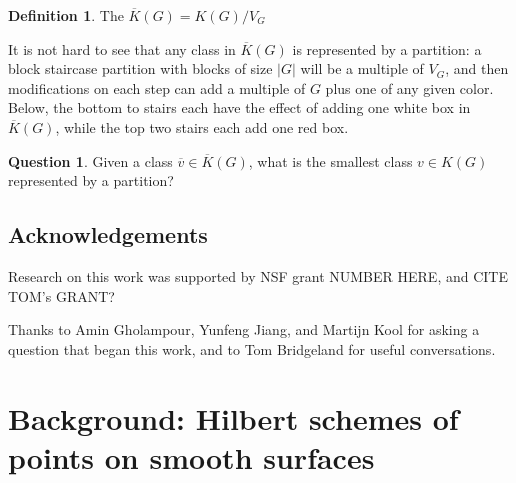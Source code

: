 \documentclass{amsart}[12pt]
\theoremstyle{definition}
\newtheorem{definition}[dummy]{Definition}
\newtheorem{question}{Question}
\begin{document}
\begin{definition}
The $\overline{K}(G)=K(G)/V_G$ 
\end{definition}

It is not hard to see that any class in $\overline{K}(G)$ is represented by a partition: a block staircase partition with blocks of size $|G|$ will be a multiple of $V_G$, and then modifications on each step can add a multiple of $G$ plus one of any given color.  Below, the bottom to stairs each have the effect of adding one white box in $\overline{K}(G)$, while the top two stairs each add one red box.



\begin{question}
Given a class $\overline{v}\in \overline{K}(G)$, what is the smallest class $v\in K(G)$ represented by a partition?
\end{question}


\subsection{Acknowledgements}

Research on this work was supported by NSF grant NUMBER HERE, and CITE TOM's GRANT?

Thanks to Amin Gholampour, Yunfeng Jiang, and Martijn Kool for asking a question that began this work, and to Tom Bridgeland for useful conversations.



\section{Background: Hilbert schemes of points on smooth surfaces}
\end{document}
